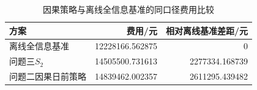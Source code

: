 \begin{table}[H]
\centering\small
\caption{因果策略与离线全信息基准的同口径费用比较}\label{tab:information-bound}
\setlength{\tabcolsep}{5pt}
\begin{tabular}{lrr}
\toprule
方案 & 费用/元 & 相对离线基准差距/元 \\
\midrule
离线全信息基准 & 12228166.562875 & 0 \\
问题三$S_2$ & 14505500.731613 & 2277334.168739 \\
问题二因果日前策略 & 14839462.002357 & 2611295.439482 \\
\bottomrule
\end{tabular}
\end{table}
